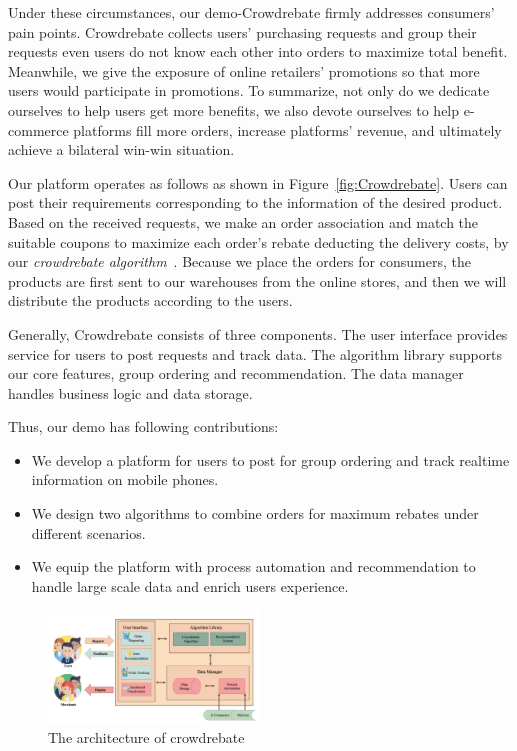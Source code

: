 Under these circumstances, our demo-Crowdrebate firmly addresses consumers' pain points. Crowdrebate collects users' purchasing requests and group their requests even users do not know each other into orders to maximize total benefit. Meanwhile, we give the exposure of online retailers' promotions so that more users would participate in promotions. To summarize, not only do we dedicate ourselves to help users get more benefits, we also devote ourselves to help e-commerce platforms fill more orders, increase platforms’ revenue, and ultimately achieve a bilateral win-win situation.

Our platform operates as follows as shown in Figure~\ref{fig:Crowdrebate}. Users can post their requirements corresponding to the information of the desired product. Based on the received requests, we make an order association and match the suitable coupons to maximize each order's rebate deducting the delivery costs, by our \emph{crowdrebate algorithm}~\cite{Report}. Because we place the orders for consumers, the products are first sent to our warehouses from the online stores, and then we will distribute the products according to the users.

Generally, Crowdrebate consists of three components. The user interface provides service for users to post requests and track data. The algorithm library supports our core features, group ordering and recommendation. The data manager handles business logic and data storage.

Thus, our demo has following contributions:
\begin{itemize}
	\item We develop a platform for users to post for group ordering and track realtime information on mobile phones.
	\item We design two algorithms to combine orders for maximum rebates under different scenarios.
	\item We equip the platform with process automation and recommendation to handle large scale data and enrich users experience.
\end{itemize}
\begin{figure}[t] \vspace{-2ex}
	\centering %
	\includegraphics[width=0.5\textwidth]{../figure/ar.png} %
	\caption{The architecture of crowdrebate} %
	\label{fig:ar} %
	\vspace{-2ex}
\end{figure}

